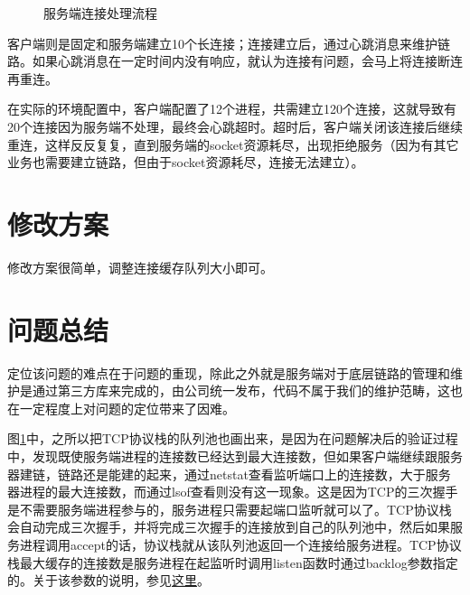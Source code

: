 \documentclass[a4paper, 11pt, titlepage]{article}
\newlength{\du}
\begin{document}
\begin{figure}[!htb]
\begin{center}
\begin{singlespace}
    \end{singlespace}
  \end{center}
  \caption{服务端连接处理流程}
  \label{fig1}
\end{figure}

客户端则是固定和服务端建立10个长连接；连接建立后，通过心跳消息来维护链路。如果心跳消息在一定时间内没有响应，就认为连接有问题，会马上将连接断连再重连。

在实际的环境配置中，客户端配置了12个进程，共需建立120个连接，这就导致有20个连接因为服务端不处理，最终会心跳超时。超时后，客户端关闭该连接后继续重连，这样反反复复，直到服务端的socket资源耗尽，出现拒绝服务（因为有其它业务也需要建立链路，但由于socket资源耗尽，连接无法建立）。

\section{修改方案}
修改方案很简单，调整连接缓存队列大小即可。

\section{问题总结}
定位该问题的难点在于问题的重现，除此之外就是服务端对于底层链路的管理和维护是通过第三方库来完成的，由公司统一发布，代码不属于我们的维护范畴，这也在一定程度上对问题的定位带来了因难。

图\ref{fig1}中，之所以把TCP协议栈的队列池也画出来，是因为在问题解决后的验证过程中，发现既使服务端进程的连接数已经达到最大连接数，但如果客户端继续跟服务器建链，链路还是能建的起来，通过netstat查看监听端口上的连接数，大于服务器进程的最大连接数，而通过lsof查看则没有这一现象。这是因为TCP的三次握手是不需要服务端进程参与的，服务进程只需要起端口监听就可以了。TCP协议栈会自动完成三次握手，并将完成三次握手的连接放到自己的队列池中，然后如果服务进程调用accept的话，协议栈就从该队列池返回一个连接给服务进程。TCP协议栈最大缓存的连接数是服务进程在起监听时调用listen函数时通过backlog参数指定的。关于该参数的说明，参见\href{http://www.cppblog.com/thisisbin/archive/2010/02/07/107444.html}{这里}。
\end{document}
